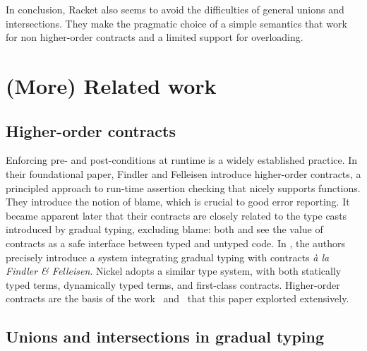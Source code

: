 \documentclass[sigplan,10pt,review,anonymous]{acmart}
\newcommand{\unsure}[2][1=]{}
\newcommand{\info}[2][1=]{}
\begin{document}
In conclusion, Racket also seems to avoid the difficulties of general unions and
intersections. They make the pragmatic choice of a simple semantics that work
for non higher-order contracts and a limited support for overloading.

\section{(More) Related work}
\label{sec:related-work}
\info{Including a mention of statically typed systems with union}

\unsure{WARNING: what is below is being reworked by Yann}

\subsection{Higher-order contracts}

Enforcing pre- and post-conditions at runtime is a widely established practice.
In their foundational paper\cite{FindlerFelleisenHOContracts}, Findler and
Felleisen introduce higher-order contracts, a principled approach to run-time
assertion checking that nicely supports functions. They introduce the notion of
blame, which is crucial to good error reporting. It became apparent later that
their contracts are closely related to the type casts introduced by gradual
typing, excluding blame: both \cite{FindlerMultiLang} and
\cite{FelleisenInterLang} see the value of contracts as a safe interface between
typed and untyped code. In \cite{WellTypedBlamed}, the authors precisely
introduce a system integrating gradual typing with contracts \textit{à la
Findler \& Felleisen}. Nickel adopts a similar type system, with both statically
typed terms, dynamically typed terms, and first-class contracts. Higher-order
contracts are the basis of the work~\cite{KeilThiemannUnionIntersection}
and~\cite{RootCauseOfBlame} that this paper explorted extensively.

\subsection{Unions and intersections in gradual typing}
\end{document}
